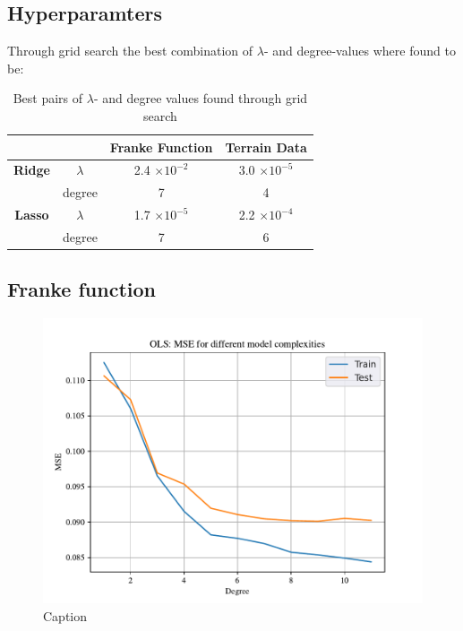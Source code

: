 
\subsection{Hyperparamters}

Through grid search the best combination of $\lambda$- and degree-values where found to be: 

\begin{table}[h!]
    \centering
    \begin{tabular}{|c|c|c|c|}
        \hline
        & & \textbf{Franke Function} & \textbf{Terrain Data} \\ \hline
        \textbf{Ridge} & $\lambda$ & 2.4 $\times 10^{-2}$ & 3.0 $\times 10^{-5}$ \\ 
         & degree & 7 & 4 \\ \hline
        \textbf{Lasso} & $\lambda$ & 1.7 $\times 10^{-5}$ & 2.2 $\times 10^{-4}$ \\ 
         & degree & 7 & 6 \\ \hline
    \end{tabular}
    \caption{Best pairs of $\lambda$- and degree values found through grid search}
    \label{tab:my_label}
\end{table}

\subsection{Franke function}

\begin{figure}[h!]
    \centering
    \includegraphics[width=1\linewidth]{project_1_alt/figures/data/OLS_MSE_Franke_Noise.pdf}
    \caption{Caption}
    \label{fig:mseols}
\end{figure}

